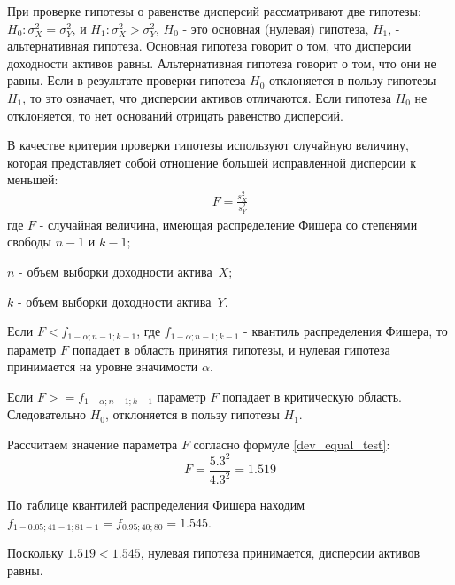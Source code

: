 \documentclass[12pt, table, twoside, a4paper]{exam}
\begin{document}
\begin{questions}
\begin{solution}[6em]
	
	\raggedright
	При проверке гипотезы о равенстве дисперсий рассматривают две гипотезы: $H_0: \sigma_X^2=\sigma_Y^2$, и $H_1: \sigma_X^2 > \sigma_Y^2$, $H_0$ - это основная (нулевая) гипотеза, $H_1$, - альтернативная гипотеза. 
	Основная гипотеза говорит о том, что дисперсии доходности активов равны. Альтернативная гипотеза говорит о том, что они не равны. Если в результате проверки гипотеза $H_0$ отклоняется в пользу гипотезы $H_1$, то это означает, что дисперсии активов отличаются. Если гипотеза $H_0$ не отклоняется, то нет оснований отрицать равенство дисперсий.
	
	В качестве критерия проверки гипотезы используют случайную величину, которая представляет собой отношение большей исправленной дисперсии к меньшей:
	\begin{align}
	\label{dev_equal_test}
	F=\frac{s_X^2}{s_Y^2}
	\end{align}
	где
	$F$ - случайная величина, имеющая распределение Фишера со степенями свободы $n-1$ и $k-1$;
	
	$n$ - объем выборки доходности актива~$X$;
	
	$k$ - объем выборки доходности актива~$Y$.
	
	Если $F<f_{1-\alpha;n-1;k-1}$, где $f_{1-\alpha;n-1;k-1}$ - квантиль распределения Фишера, то параметр $F$ попадает в область принятия гипотезы, и нулевая гипотеза принимается на уровне значимости $\alpha$.
	
	Если  $F>=f_{1-\alpha;n-1;k-1}$ параметр $F$ попадает в критическую область. Следовательно $H_0$, отклоняется в пользу гипотезы $H_1$.
	
	Рассчитаем значение параметра $F$ согласно формуле \eqref{dev_equal_test}:
	$$F=\frac{5.3^2}{4.3^2}=1.519$$
	
	По таблице квантилей распределения Фишера находим $f_{1-0.05;41-1;81-1}=f_{0.95;40;80}=1.545$. 
	
	Поскольку $1.519<1.545$, нулевая гипотеза принимается, дисперсии активов равны.
\end{solution}


\end{questions}
\end{document}
